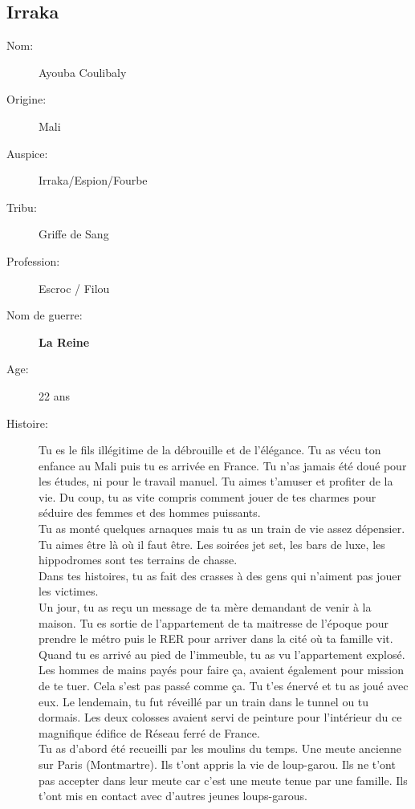 \documentclass[oneside,12pt]{book}
\newcommand{\Dame}{\textbf{La Reine} }
\begin{document}
\begin{flushleft}
\section{Irraka}
\begin{description}
\item[Nom:]{Ayouba Coulibaly}
\item[Origine:]{Mali}
\item[Auspice:]{Irraka/Espion/Fourbe}
\item[Tribu:]{Griffe de Sang}
\item[Profession:]{Escroc / Filou}
\item[Nom de guerre:]{\Dame}
\item[Age:]{22 ans}
\item[Histoire:]{
Tu es le fils illégitime de la débrouille et de l’élégance. Tu as vécu ton enfance au Mali puis tu es arrivée en France. 
Tu n'as jamais été doué pour les études, ni pour le travail manuel. Tu aimes t’amuser et profiter de la vie.
Du coup, tu as vite compris comment jouer de tes charmes pour séduire des femmes et des hommes puissants.\\
Tu as monté quelques arnaques mais tu as un train de vie assez dépensier. Tu aimes être là où il faut être. Les soirées jet set, les bars de luxe, les hippodromes sont tes terrains de chasse. \\
Dans tes histoires, tu as fait des crasses à des gens qui n'aiment pas jouer les victimes.\\
Un jour, tu as reçu un message de ta mère demandant de venir à la maison. Tu es sortie de l'appartement de ta maitresse de l'époque pour prendre le métro puis le RER pour arriver dans la cité où ta famille vit.\\
Quand tu es arrivé au pied de l'immeuble, tu as vu l’appartement explosé.\\
Les hommes de mains payés pour faire ça, avaient également pour mission de te tuer. Cela s'est pas passé comme ça.
Tu t'es énervé et tu as joué avec eux. Le lendemain, tu fut réveillé par un train dans le tunnel ou tu dormais. Les deux colosses avaient servi de peinture pour l'intérieur du ce magnifique édifice de Réseau ferré de France.\\
Tu as d'abord été recueilli par les moulins du temps. Une meute ancienne sur Paris (Montmartre). Ils t'ont appris la vie de loup-garou.
Ils ne t'ont pas accepter dans leur meute car c'est une meute tenue par une famille. Ils t'ont mis en contact avec d'autres jeunes loups-garous.\\
}
\end{description}
\end{flushleft}
\end{document}
